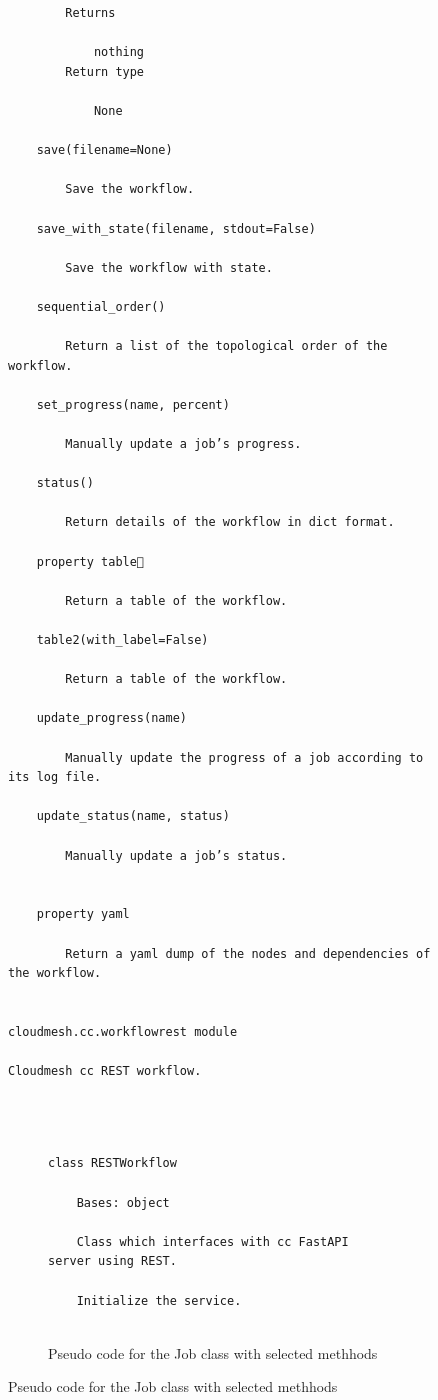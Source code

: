 \begin{figure}[htb]
\begin{verbatim}
        Returns

            nothing
        Return type

            None

    save(filename=None)

        Save the workflow.

    save_with_state(filename, stdout=False)

        Save the workflow with state.

    sequential_order()

        Return a list of the topological order of the workflow.

    set_progress(name, percent)

        Manually update a job’s progress.

    status()

        Return details of the workflow in dict format.

    property table

        Return a table of the workflow.

    table2(with_label=False)

        Return a table of the workflow.

    update_progress(name)

        Manually update the progress of a job according to its log file.

    update_status(name, status)

        Manually update a job’s status.


    property yaml

        Return a yaml dump of the nodes and dependencies of the workflow.


cloudmesh.cc.workflowrest module

Cloudmesh cc REST workflow.



\end{verbatim}



\begin{figure}[htb]
\caption{Pseudo code for the Job class with selected methhods}
\label{fig:code-workflow-rest}
\begin{verbatim}

class RESTWorkflow

    Bases: object

    Class which interfaces with cc FastAPI server using REST.

    Initialize the service.


\end{verbatim}
\end{figure}
\end{figure}
